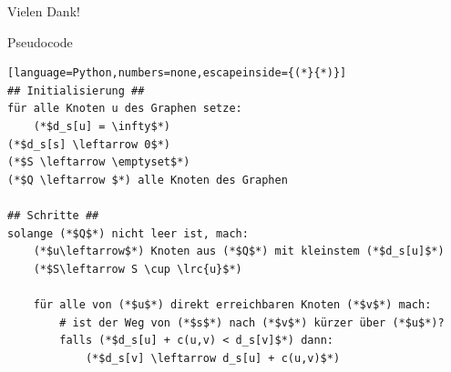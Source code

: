 \begin{frame}[fragile]{}
\begin{center}
Vielen Dank!
\end{center}
\end{frame}


\begin{frame}[fragile]{Pseudocode}
\lstset{basicstyle=\ttfamily\footnotesize}
\begin{lstlisting}[language=Python,numbers=none,escapeinside={(*}{*)}]
## Initialisierung ##
für alle Knoten u des Graphen setze:
    (*$d_s[u] = \infty$*)
(*$d_s[s] \leftarrow 0$*)
(*$S \leftarrow \emptyset$*)
(*$Q \leftarrow $*) alle Knoten des Graphen

## Schritte ##
solange (*$Q$*) nicht leer ist, mach:
    (*$u\leftarrow$*) Knoten aus (*$Q$*) mit kleinstem (*$d_s[u]$*)
    (*$S\leftarrow S \cup \lrc{u}$*)

    für alle von (*$u$*) direkt erreichbaren Knoten (*$v$*) mach:
        # ist der Weg von (*$s$*) nach (*$v$*) kürzer über (*$u$*)?
        falls (*$d_s[u] + c(u,v) < d_s[v]$*) dann:
            (*$d_s[v] \leftarrow d_s[u] + c(u,v)$*)
\end{lstlisting}
\lstset{basicstyle=\ttfamily\scriptsize}
\end{frame}